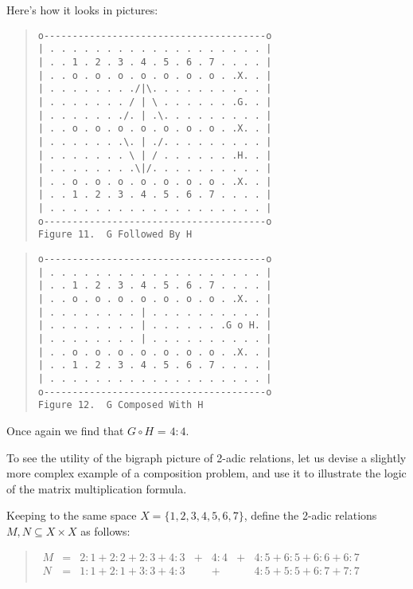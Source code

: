\documentclass[12pt]{article}
\begin{document}
Here's how it looks in pictures:

\begin{quote}\begin{verbatim}
o---------------------------------------o
| . . . . . . . . . . . . . . . . . . . |
| . . 1 . 2 . 3 . 4 . 5 . 6 . 7 . . . . |
| . . o . o . o . o . o . o . o . .X. . |
| . . . . . . . ./|\. . . . . . . . . . |
| . . . . . . . / | \ . . . . . . .G. . |
| . . . . . . ./. | .\. . . . . . . . . |
| . . o . o . o . o . o . o . o . .X. . |
| . . . . . . .\. | ./. . . . . . . . . |
| . . . . . . . \ | / . . . . . . .H. . |
| . . . . . . . .\|/. . . . . . . . . . |
| . . o . o . o . o . o . o . o . .X. . |
| . . 1 . 2 . 3 . 4 . 5 . 6 . 7 . . . . |
| . . . . . . . . . . . . . . . . . . . |
o---------------------------------------o
Figure 11.  G Followed By H
\end{verbatim}\end{quote}

\begin{quote}\begin{verbatim}
o---------------------------------------o
| . . . . . . . . . . . . . . . . . . . |
| . . 1 . 2 . 3 . 4 . 5 . 6 . 7 . . . . |
| . . o . o . o . o . o . o . o . .X. . |
| . . . . . . . . | . . . . . . . . . . |
| . . . . . . . . | . . . . . . .G o H. |
| . . . . . . . . | . . . . . . . . . . |
| . . o . o . o . o . o . o . o . .X. . |
| . . 1 . 2 . 3 . 4 . 5 . 6 . 7 . . . . |
| . . . . . . . . . . . . . . . . . . . |
o---------------------------------------o
Figure 12.  G Composed With H
\end{verbatim}\end{quote}

Once again we find that $G \circ H$ = $4:4$.

To see the utility of the bigraph picture of 2-adic relations, let us devise a slightly more complex example of a composition problem, and use it to illustrate the logic of the matrix multiplication formula.

Keeping to the same space $X = \{ 1, 2, 3, 4, 5, 6, 7 \}$, define the 2-adic relations $M, N \subseteq X \times X$ as follows:

\begin{quote}$\begin{array}{lcccccc}
M & = & 2\mathrm{:}1 + 2\mathrm{:}2 + 2\mathrm{:}3 + 4\mathrm{:}3 & + & 4\mathrm{:}4 & + & 4\mathrm{:}5 + 6\mathrm{:}5 + 6\mathrm{:}6 + 6\mathrm{:}7 \\
N & = & 1\mathrm{:}1 + 2\mathrm{:}1 + 3\mathrm{:}3 + 4\mathrm{:}3 &   &      +       &   & 4\mathrm{:}5 + 5\mathrm{:}5 + 6\mathrm{:}7 + 7\mathrm{:}7 \\
\end{array}$\end{quote}
\end{document}
